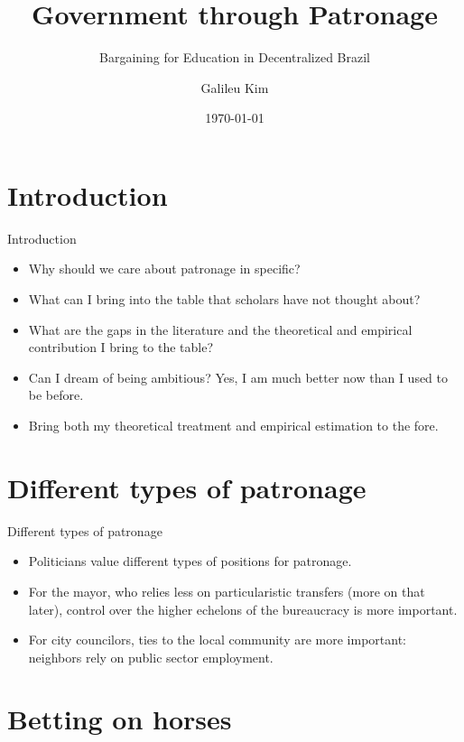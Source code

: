 \documentclass[
  ignorenonframetext,
]{beamer}
\date[]{\today}
\title{Government through Patronage}
\subtitle{Bargaining for Education in Decentralized Brazil}
\author{Galileu Kim}
\date{}
\institute{Princeton University}
\providecommand{\tightlist}{%
  \setlength{\itemsep}{0pt}\setlength{\parskip}{0pt}}
\begin{document}
\frame{\titlepage}

\hypertarget{introduction}{%
\section{Introduction}\label{introduction}}

\begin{frame}{Introduction}
\begin{itemize}
\tightlist
\item
  Why should we care about patronage in specific?
\item
  What can I bring into the table that scholars have not thought about?
\item
  What are the gaps in the literature and the theoretical and empirical
  contribution I bring to the table?
\item
  Can I dream of being ambitious? Yes, I am much better now than I used
  to be before.
\item
  Bring both my theoretical treatment and empirical estimation to the
  fore.
\end{itemize}
\end{frame}

\hypertarget{different-types-of-patronage}{%
\section{Different types of
patronage}\label{different-types-of-patronage}}

\begin{frame}{Different types of patronage}
\begin{itemize}
\tightlist
\item
  Politicians value different types of positions for patronage.
\item
  For the mayor, who relies less on particularistic transfers (more on
  that later), control over the higher echelons of the bureaucracy is
  more important.
\item
  For city councilors, ties to the local community are more important:
  neighbors rely on public sector employment.
\end{itemize}
\end{frame}

\hypertarget{betting-on-horses}{%
\section{Betting on horses}\label{betting-on-horses}}
\end{document}
